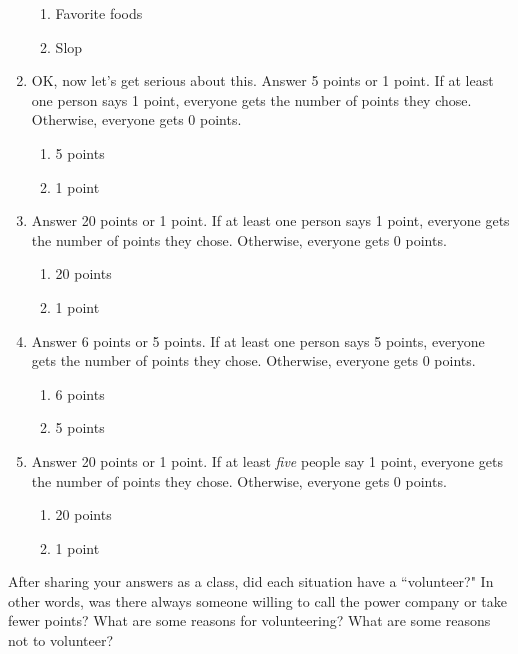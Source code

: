 \begin{enumerate}
\begin{enumerate}
\item Favorite foods
\item Slop
\end{enumerate}

\item OK, now let's get serious about this. Answer 5 points or 1 point. If at least one person says 1 point, everyone gets the number of points they chose. Otherwise, everyone gets 0 points.

\begin{enumerate}
\item 5 points
\item 1 point
\end{enumerate}

\item Answer 20 points or 1 point. If at least one person says 1 point, everyone gets the number of points they chose. Otherwise, everyone gets 0 points.

\begin{enumerate}
\item 20 points
\item 1 point
\end{enumerate}

\item Answer 6 points or 5 points. If at least one person says 5 points, everyone gets the number of points they chose. Otherwise, everyone gets 0 points.

\begin{enumerate}
\item 6 points
\item 5 points
\end{enumerate}

\item Answer 20 points or 1 point. If at least {\it five}  people say 1 point, everyone gets the number of points they chose. Otherwise, everyone gets 0 points.

\begin{enumerate}
\item 20 points
\item 1 point
\end{enumerate}



\end{enumerate}

After sharing your answers as a class, did each situation have a ``volunteer?" In other words, was there always someone willing to call the power company or take fewer points? What are some reasons for volunteering? What are some reasons not to volunteer?